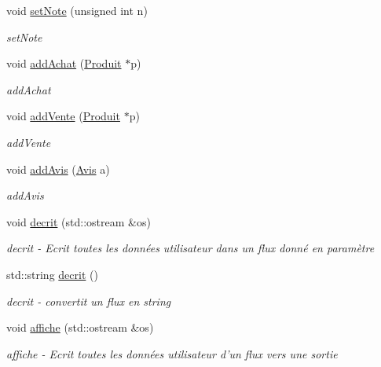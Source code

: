 \begin{DoxyCompactItemize}
void \hyperlink{class_utilisateur_a703b2dbde2ba4e30fceefa651d4ab51f}{set\-Note} (unsigned int n)
\begin{DoxyCompactList}\small\item\em set\-Note \end{DoxyCompactList}\item 
void \hyperlink{class_utilisateur_a0f2ef558d9a70caf2bccfc81f15027fc}{add\-Achat} (\hyperlink{class_produit}{Produit} $\ast$p)
\begin{DoxyCompactList}\small\item\em add\-Achat \end{DoxyCompactList}\item 
void \hyperlink{class_utilisateur_ac388127f7ea147a70a67ff6345ccb164}{add\-Vente} (\hyperlink{class_produit}{Produit} $\ast$p)
\begin{DoxyCompactList}\small\item\em add\-Vente \end{DoxyCompactList}\item 
void \hyperlink{class_utilisateur_aa8b2cad2349702cf2fa8f23fef2e5a9d}{add\-Avis} (\hyperlink{class_avis}{Avis} a)
\begin{DoxyCompactList}\small\item\em add\-Avis \end{DoxyCompactList}\item 
void \hyperlink{class_utilisateur_ad4c1dbab122bf719cf1419b9d93a0e22}{decrit} (std\-::ostream \&os)
\begin{DoxyCompactList}\small\item\em decrit -\/ Ecrit toutes les données utilisateur dans un flux donné en paramètre \end{DoxyCompactList}\item 
std\-::string \hyperlink{class_utilisateur_a938eda997ac76805b7674c7ffe7e17e8}{decrit} ()
\begin{DoxyCompactList}\small\item\em decrit -\/ convertit un flux en string \end{DoxyCompactList}\item 
void \hyperlink{class_utilisateur_a810f877d63ef4b8b2f6b18dfc1cd26f9}{affiche} (std\-::ostream \&os)
\begin{DoxyCompactList}\small\item\em affiche -\/ Ecrit toutes les données utilisateur d'un flux vers une sortie \end{DoxyCompactList}\end{DoxyCompactItemize}



